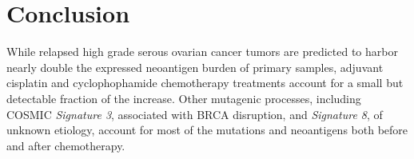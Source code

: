 \section*{Conclusion}
While relapsed high grade serous ovarian cancer tumors are predicted to harbor nearly double the expressed neoantigen burden of primary samples, adjuvant cisplatin and cyclophophamide chemotherapy treatments account for a small but detectable fraction of the increase. Other mutagenic processes, including COSMIC \textit{Signature 3}, associated with BRCA disruption, and \textit{Signature 8}, of unknown etiology, account for most of the mutations and neoantigens both before and after chemotherapy.